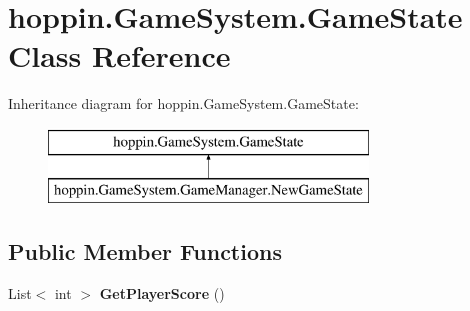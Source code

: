 \hypertarget{classhoppin_1_1_game_system_1_1_game_state}{}\section{hoppin.\+Game\+System.\+Game\+State Class Reference}
\label{classhoppin_1_1_game_system_1_1_game_state}
Inheritance diagram for hoppin.\+Game\+System.\+Game\+State\+:\begin{figure}[H]
\begin{center}
\leavevmode
\includegraphics[height=2.000000cm]{classhoppin_1_1_game_system_1_1_game_state}
\end{center}
\end{figure}
\subsection*{Public Member Functions}
\begin{DoxyCompactItemize}
\item 
List$<$ int $>$ {\bfseries Get\+Player\+Score} ()\hypertarget{classhoppin_1_1_game_system_1_1_game_state_a7fd6f968ac6db4620762f1f5071a435b}{}\label{classhoppin_1_1_game_system_1_1_game_state_a7fd6f968ac6db4620762f1f5071a435b}

\end{DoxyCompactItemize}
